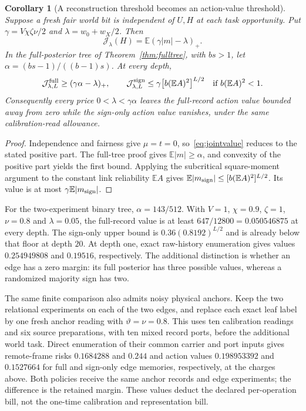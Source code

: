 \documentclass[11pt,a4paper]{article}
\newtheorem{corollary}[definition]{Corollary}
\newcommand{\E}{\mathbb E}
\begin{document}
\begin{corollary}[A reconstruction threshold becomes an action-value threshold]\label{cor:actiontree}
Suppose a fresh fair world bit is independent of $U,H$ at each task opportunity. Put
$\gamma=V\chi\zeta\nu/2$ and $\lambda=w_0+w_X/2$. Then
\[
 \mathcal J_\lambda(H)=\E(\gamma|m|-\lambda)_+.
\]
In the full-posterior tree of Theorem~\ref{thm:fulltree}, with $bs>1$, let
$\alpha=(bs-1)/((b-1)s)$. At every depth,
\begin{equation}\label{eq:treevalue}
 \mathcal J^{\rm full}_{\lambda,L}\ge(\gamma\alpha-\lambda)_+,
 \qquad
 \mathcal J^{\rm sign}_{\lambda,L}\le
        \gamma\bigl[b(\E A)^2\bigr]^{L/2}
 \quad\text{if }b(\E A)^2<1.
\end{equation}
Consequently every price $0<\lambda<\gamma\alpha$ leaves the full-record action value bounded away from zero while the sign-only action value vanishes, under the same calibration-read allowance.
\end{corollary}
\begin{proof}
Independence and fairness give $\mu=t=0$, so~\eqref{eq:jointvalue} reduces to the stated positive part. The full-tree proof gives $\E|m|\ge\alpha$, and convexity of the positive part yields the first bound. Applying the subcritical square-moment argument to the constant link reliability $\E A$ gives $\E|m_{\rm sign}|\le[b(\E A)^2]^{L/2}$. Its value is at most $\gamma\E|m_{\rm sign}|$.
\end{proof}

For the two-experiment binary tree, $\alpha=143/512$. With $V=1$, $\chi=0.9$, $\zeta=1$, $\nu=0.8$ and $\lambda=0.05$, the full-record value is at least $647/12800=0.050546875$ at every depth. The sign-only upper bound is $0.36(0.8192)^{L/2}$ and is already below that floor at depth $20$. At depth one, exact raw-history enumeration gives values $0.254949808$ and $0.19516$, respectively. The additional distinction is whether an edge has a zero margin: its full posterior has three possible values, whereas a randomized majority sign has two.

The same finite comparison also admits noisy physical anchors. Keep the two relational experiments on each of the two edges, and replace each exact leaf label by one fresh anchor reading with $\vartheta=\nu=0.8$. This uses ten calibration readings and six source preparations, with ten mixed record ports, before the additional world task. Direct enumeration of their common carrier and port inputs gives remote-frame risks $0.1684288$ and $0.244$ and action values $0.198953392$ and $0.1527664$ for full and sign-only edge memories, respectively, at the charges above. Both policies receive the same anchor records and edge experiments; the difference is the retained margin. These values deduct the declared per-operation bill, not the one-time calibration and representation bill.
\end{document}
